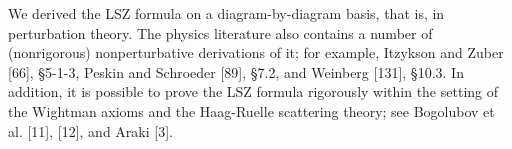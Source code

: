 \documentclass[10pt, letterpaper]{article}
\begin{document}
We derived the LSZ formula on a diagram-by-diagram basis, that is, in perturbation theory. The physics literature also contains a number of (nonrigorous) nonperturbative derivations of it; for example, Itzykson and Zuber [66], §5-1-3, Peskin and Schroeder [89], §7.2, and Weinberg [131], §10.3. In addition, it is possible to prove the LSZ formula rigorously within the setting of the Wightman axioms and the Haag-Ruelle scattering theory; see Bogolubov et al. [11], [12], and Araki [3].



\pagebreak
\printbibliography
\end{document}
